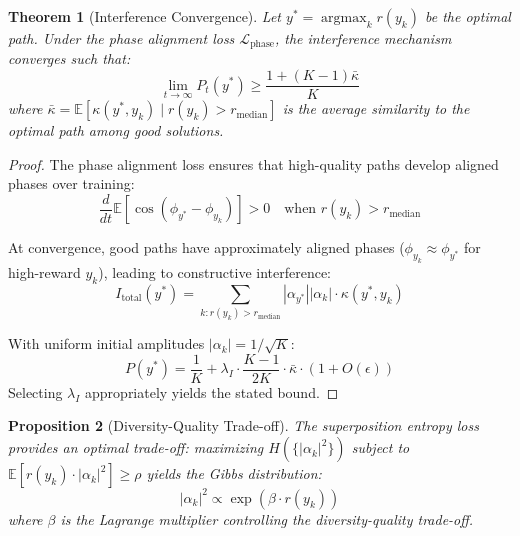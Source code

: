 \documentclass[11pt,a4paper]{article}
\newtheorem{theorem}{Theorem}[section]
\newtheorem{proposition}[theorem]{Proposition}
\newcommand{\E}{\mathbb{E}}
\newcommand{\argmax}{\operatorname{argmax}}
\newcommand{\calL}{\mathcal{L}}
\begin{document}
\begin{theorem}[Interference Convergence]
\label{thm:qstar_converge}
Let $y^* = \argmax_k r(y_k)$ be the optimal path. Under the phase alignment loss $\calL_{\text{phase}}$, the interference mechanism converges such that:
\begin{equation}
    \lim_{t \to \infty} P_t(y^*) \geq \frac{1 + (K-1)\bar{\kappa}}{K}
\end{equation}
where $\bar{\kappa} = \E[\kappa(y^*, y_k) \mid r(y_k) > r_{\text{median}}]$ is the average similarity to the optimal path among good solutions.
\end{theorem}

\begin{proof}
The phase alignment loss ensures that high-quality paths develop aligned phases over training:
\begin{equation}
    \frac{d}{dt}\E[\cos(\phi_{y^*} - \phi_{y_k})] > 0 \quad \text{when } r(y_k) > r_{\text{median}}
\end{equation}

At convergence, good paths have approximately aligned phases ($\phi_{y_k} \approx \phi_{y^*}$ for high-reward $y_k$), leading to constructive interference:
\begin{equation}
    I_{\text{total}}(y^*) = \sum_{k: r(y_k) > r_{\text{median}}} |\alpha_{y^*}||\alpha_k| \cdot \kappa(y^*, y_k)
\end{equation}

With uniform initial amplitudes $|\alpha_k| = 1/\sqrt{K}$:
\begin{equation}
    P(y^*) = \frac{1}{K} + \lambda_I \cdot \frac{K-1}{2K} \cdot \bar{\kappa} \cdot (1 + O(\epsilon))
\end{equation}
Selecting $\lambda_I$ appropriately yields the stated bound.
\end{proof}

\begin{proposition}[Diversity-Quality Trade-off]
\label{prop:qstar_tradeoff}
The superposition entropy loss provides an optimal trade-off: maximizing $H(\{|\alpha_k|^2\})$ subject to $\E[r(y_k) \cdot |\alpha_k|^2] \geq \rho$ yields the Gibbs distribution:
\begin{equation}
    |\alpha_k|^2 \propto \exp(\beta \cdot r(y_k))
\end{equation}
where $\beta$ is the Lagrange multiplier controlling the diversity-quality trade-off.
\end{proposition}

\end{document}
